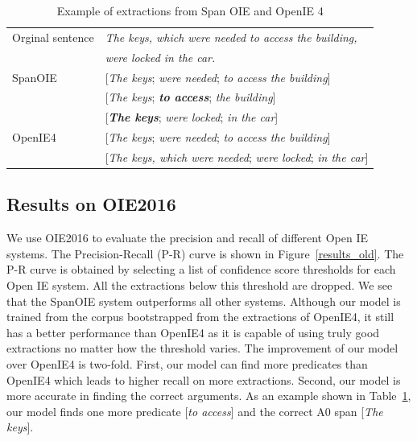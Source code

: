 \documentclass[letterpaper]{article} %
\begin{document}
\begin{table}[t!]
\begin{center}
\begin{tabular}{|l|l|}
\hline 
Orginal sentence & \emph{The keys, which were needed to access the building,}\\
&  \emph{were locked in the car.}\\ 
\hline 
SpanOIE & [\emph{The keys}; \emph{were needed}; \emph{to access the building}]\\
         & [\emph{The keys}; \emph{\textbf{to access}}; \emph{the building}]\\
         & [\emph{\textbf{The keys}}; \emph{were locked}; \emph{in the car}]\\
\hline
OpenIE4 & [\emph{The keys}; \emph{were needed}; \emph{to access the building}]\\
         & [\emph{The keys, which were needed}; \emph{were locked}; \emph{in the car}]\\
\hline
\end{tabular}
\end{center}
\caption{Example of extractions from Span OIE and OpenIE 4}
\label{examples}
\end{table}


\subsection{Results on OIE2016}
We use OIE2016 to evaluate the precision and recall of different Open IE systems. The Precision-Recall (P-R) curve is shown in Figure~\ref{results_old}. The P-R curve is obtained by selecting a list of confidence score thresholds for each Open IE system. All the extractions below this threshold are dropped. We see that the SpanOIE system outperforms all other systems. Although our model is trained from the corpus bootstrapped from the extractions of OpenIE4, it still has a better performance than OpenIE4 as it is capable of using truly good extractions no matter how the threshold varies. The improvement of our model over OpenIE4 is two-fold. First, our model can find more predicates than OpenIE4 which leads to higher recall on more extractions. Second, our model is more accurate in finding the correct arguments. As an example shown in Table~\ref{examples}, our model finds one more predicate [\emph{to access}] and the correct A0 span [\emph{The keys}].
\end{document}
